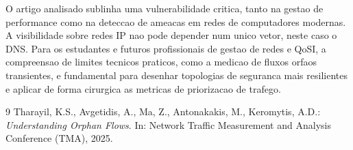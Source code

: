\documentclass[11pt, a4paper]{article}
\begin{document}
O artigo analisado sublinha uma vulnerabilidade critica, tanto na gestao de performance como na deteccao de ameacas em redes de computadores modernas. A visibilidade sobre redes IP nao pode depender num unico vetor, neste caso o DNS. Para os estudantes e futuros profissionais de gestao de redes e QoSI, a compreensao de limites tecnicos praticos, como a medicao de fluxos orfaos transientes, e fundamental para desenhar topologias de seguranca mais resilientes e aplicar de forma cirurgica as metricas de priorizacao de trafego.

\begin{thebibliography}{9}
Tharayil, K.S., Avgetidis, A., Ma, Z., Antonakakis, M., Keromytis, A.D.:
\textit{Understanding Orphan Flows}. In: Network Traffic Measurement and Analysis Conference (TMA), 2025.
\end{thebibliography}
\end{document}
